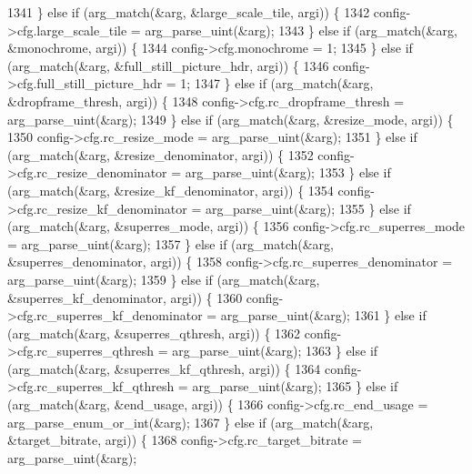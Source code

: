 \begin{DoxyCodeInclude}
{{{{{{{{{{{{{{{{1341     \} \textcolor{keywordflow}{else} \textcolor{keywordflow}{if} (arg\_match(&arg, &large\_scale\_tile, argi)) \{
1342       config->cfg.large\_scale\_tile = arg\_parse\_uint(&arg);
1343     \} \textcolor{keywordflow}{else} \textcolor{keywordflow}{if} (arg\_match(&arg, &monochrome, argi)) \{
1344       config->cfg.monochrome = 1;
1345     \} \textcolor{keywordflow}{else} \textcolor{keywordflow}{if} (arg\_match(&arg, &full\_still\_picture\_hdr, argi)) \{
1346       config->cfg.full\_still\_picture\_hdr = 1;
1347     \} \textcolor{keywordflow}{else} \textcolor{keywordflow}{if} (arg\_match(&arg, &dropframe\_thresh, argi)) \{
1348       config->cfg.rc\_dropframe\_thresh = arg\_parse\_uint(&arg);
1349     \} \textcolor{keywordflow}{else} \textcolor{keywordflow}{if} (arg\_match(&arg, &resize\_mode, argi)) \{
1350       config->cfg.rc\_resize\_mode = arg\_parse\_uint(&arg);
1351     \} \textcolor{keywordflow}{else} \textcolor{keywordflow}{if} (arg\_match(&arg, &resize\_denominator, argi)) \{
1352       config->cfg.rc\_resize\_denominator = arg\_parse\_uint(&arg);
1353     \} \textcolor{keywordflow}{else} \textcolor{keywordflow}{if} (arg\_match(&arg, &resize\_kf\_denominator, argi)) \{
1354       config->cfg.rc\_resize\_kf\_denominator = arg\_parse\_uint(&arg);
1355     \} \textcolor{keywordflow}{else} \textcolor{keywordflow}{if} (arg\_match(&arg, &superres\_mode, argi)) \{
1356       config->cfg.rc\_superres\_mode = arg\_parse\_uint(&arg);
1357     \} \textcolor{keywordflow}{else} \textcolor{keywordflow}{if} (arg\_match(&arg, &superres\_denominator, argi)) \{
1358       config->cfg.rc\_superres\_denominator = arg\_parse\_uint(&arg);
1359     \} \textcolor{keywordflow}{else} \textcolor{keywordflow}{if} (arg\_match(&arg, &superres\_kf\_denominator, argi)) \{
1360       config->cfg.rc\_superres\_kf\_denominator = arg\_parse\_uint(&arg);
1361     \} \textcolor{keywordflow}{else} \textcolor{keywordflow}{if} (arg\_match(&arg, &superres\_qthresh, argi)) \{
1362       config->cfg.rc\_superres\_qthresh = arg\_parse\_uint(&arg);
1363     \} \textcolor{keywordflow}{else} \textcolor{keywordflow}{if} (arg\_match(&arg, &superres\_kf\_qthresh, argi)) \{
1364       config->cfg.rc\_superres\_kf\_qthresh = arg\_parse\_uint(&arg);
1365     \} \textcolor{keywordflow}{else} \textcolor{keywordflow}{if} (arg\_match(&arg, &end\_usage, argi)) \{
1366       config->cfg.rc\_end\_usage = arg\_parse\_enum\_or\_int(&arg);
1367     \} \textcolor{keywordflow}{else} \textcolor{keywordflow}{if} (arg\_match(&arg, &target\_bitrate, argi)) \{
1368       config->cfg.rc\_target\_bitrate = arg\_parse\_uint(&arg);
}}}}}}}}}}}}}}}}
\end{DoxyCodeInclude}
